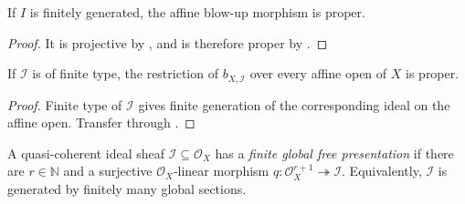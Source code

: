 \begin{lemma}
  \label{lemma:nagata-affine-blowup-proper}

  If \(I\) is finitely generated, the affine blow-up morphism is proper.
\end{lemma}

\begin{proof}
  It is projective by , and is
  therefore proper by .
\end{proof}

\begin{lemma}
  \label{lemma:nagata-global-blowup-proper-local}

  If $\mathcal I$ is of finite type, the restriction of
  $b_{X,\mathcal I}$ over every affine open of $X$ is proper.
\end{lemma}

\begin{proof}
  Finite type of $\mathcal I$ gives finite generation of the corresponding
  ideal on the affine open.  Transfer
   through
  .
\end{proof}

\begin{definition}
  \label{def:nagata-global-finite-free-generation}

  A quasi-coherent ideal sheaf \(\mathcal I\subseteq\mathcal O_X\) has a
  \emph{finite global free presentation} if there are \(r\in\mathbb N\) and
  a surjective \(\mathcal O_X\)-linear morphism
  \(q\colon\mathcal O_X^{r+1}\twoheadrightarrow\mathcal I\).
  Equivalently, \(\mathcal I\) is generated by finitely many global sections.
\end{definition}

